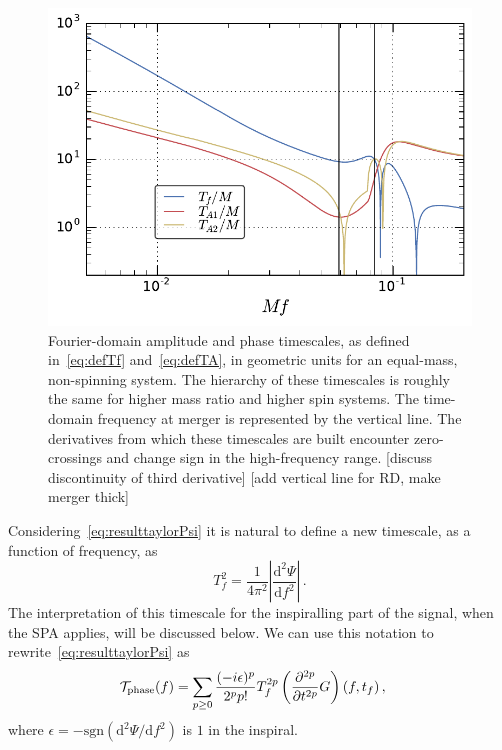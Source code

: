 \documentclass[aps,showpacs,twocolumn,
prd,superscriptaddress,nofootinbib]{revtex4-1}
\newcommand{\be}{\begin{equation}}
\newcommand{\ee}{\end{equation}}
\newcommand\ud{{\mathrm{d}}}
\newcommand\calT{{\mathcal{T}}}
\newcommand{\tf}{t_{f}}
\newcommand{\Tf}{T_{f}}
\newcommand{\SM}[1]{{\color{Red} #1}}
\begin{document}
\begin{figure}
  \centering
  \includegraphics[width=.98\linewidth]{plots/TfTA_py.pdf}
  \caption{Fourier-domain amplitude and phase timescales, as defined in~\eqref{eq:defTf} and~\eqref{eq:defTA}, in geometric units for an equal-mass, non-spinning system. The hierarchy of these timescales is roughly the same for higher mass ratio and higher spin systems. The time-domain frequency at merger is represented by the vertical line. The derivatives from which these timescales are built encounter zero-crossings and change sign in the high-frequency range. \SM{[discuss discontinuity of third derivative]}\SM{[add vertical line for RD, make merger thick]}}
  \label{fig:TfTA}
\end{figure}

Considering~\eqref{eq:resulttaylorPsi} it is natural to define a new timescale, as a function of frequency, as
\be\label{eq:defTf}
	\Tf^{2} = \frac{1}{4\pi^{2}}\left| \frac{\ud^{2}\Psi}{\ud f^{2}} \right| \,.
\ee
The interpretation of this timescale for the inspiralling part of the signal, when the SPA applies, will be discussed below. We can use this notation to rewrite~\eqref{eq:resulttaylorPsi} as
\begin{align}\label{eq:resultdffPsiTf}
	 \calT_{\rm phase}(f) &= \sum\limits_{p\geq 0} \frac{(-i\epsilon)^{p}}{2^{p}p!} \Tf^{2p} \left( \frac{\partial^{2p} }{\partial t^{2p}} G \right)(f, \tf) \,,
\end{align}
where $\epsilon = -\mathrm{sgn}(\ud^{2}\Psi/\ud f^{2} )$ is $1$ in the inspiral.
\end{document}
